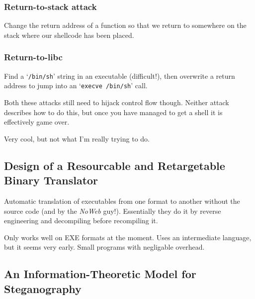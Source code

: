 \subsubsection{Return-to-stack attack}

Change the return address of a function so that we return to somewhere
on the stack where our shellcode has been placed.

\subsubsection{Return-to-libc}

Find a `\texttt{/bin/sh}' string in an executable (difficult!), then
overwrite a return address to jump into an `\texttt{execve /bin/sh}'
call.

Both these attacks still need to hijack control flow though. Neither
attack describes how to do this, but once you have managed to get a
shell it is effectively game over.

Very cool, but not what I'm really trying to do.

\subsection{Design of a Resourcable and Retargetable Binary Translator}

Automatic translation of executables from one format to another without
the source code (and by the \emph{NoWeb} guy!). Essentially they do it
by reverse engineering and decompiling before recompiling it.

Only works well on EXE formats at the moment. Uses an intermediate
language, but it seems very early. Small programs with negligable
overhead.

\subsection{An Information-Theoretic Model for Steganography}

